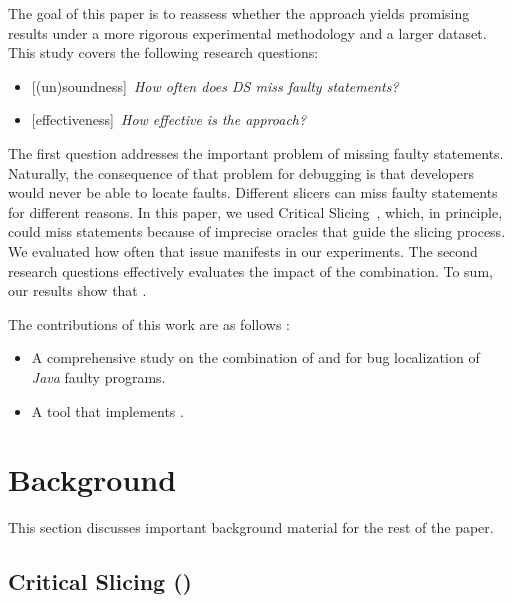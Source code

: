 \documentclass{article}
\begin{document}
The goal of this paper is to reassess whether the \comb{} approach
yields promising results under a more rigorous experimental
methodology and a larger dataset. This study covers the following research questions:

\newcommand{\rqone}{How often does DS miss faulty statements?}
\newcommand{\rqthree}{How effective is the \comb{} approach?}

\begin{itemize}[leftmargin=*]
\item[]{\footnotesize[(un)soundness]}~\textit{\rqone{}}
\item[]{\footnotesize[effectiveness]}~\textit{\rqthree{}}
\end{itemize}

The first question addresses the important problem of missing faulty
statements. Naturally, the consequence of that problem for debugging
is that developers would never be able to locate faults. Different
slicers can miss faulty statements for different reasons. In this
paper, we used Critical Slicing~\cite{DeMillo:1996:CSS:229000.226310},
which, in principle, could miss statements because of imprecise
oracles that guide the slicing process. We evaluated how often that
issue manifests in our experiments. The second research questions
effectively evaluates the impact of the combination. To sum, our
results show that .

The contributions of this work are as follows :
\begin{itemize}
	\item A comprehensive study on the combination of \sfl{} and \ds{}
     for bug localization of \emph{Java} faulty programs.
   \item A tool that implements \comb{}.
\end{itemize}

\section{Background}
\label{sec:background}

This section discusses  important background material for the rest of the paper.

\subsection{Critical Slicing (\cs{})}
\label{sec:slicing}
\end{document}
